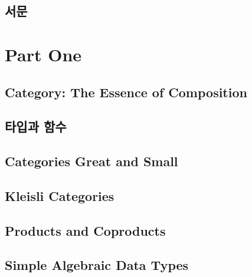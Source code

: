 

\frontmatter
\tableofcontents


\chapter*{서문}
\label{서문}


\mainmatter

\part*{Part One}

\chapter{Category: The Essence of Composition}\label{category-the-essence-of-composition}


\chapter{타입과 함수}\label{타입과 함수}


\chapter{Categories Great and Small}\label{categories-great-and-small}


\chapter{Kleisli Categories}\label{kleisli-categories}


\chapter{Products and Coproducts}\label{products-and-coproducts}


\chapter{Simple Algebraic Data Types}\label{simple-algebraic-data-types}


